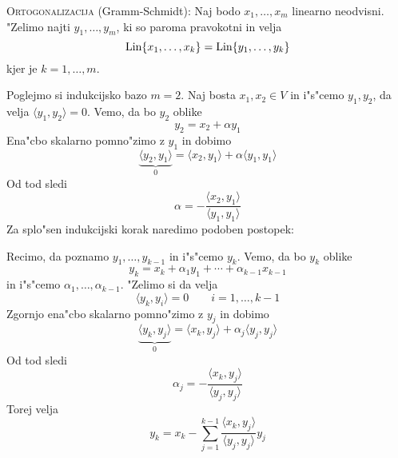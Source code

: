 \textsc{Ortogonalizacija} (Gramm-Schmidt): Naj bodo $x_1, \ldots, x_m$ linearno neodvisni. "Zelimo najti $y_1, \ldots, y_m$, ki so paroma pravokotni in velja
\begin{equation*}
\text{Lin} \{ x_1, \ldots, x_k \} = \text{Lin} \{ y_1, \ldots, y_k \}
\end{equation*}
kjer je $k = 1, \ldots, m$.

Poglejmo si indukcijsko bazo $m = 2$. Naj bosta $x_1, x_2 \in V$ in i"s"cemo $y_1, y_2$, da velja $\langle y_1, y_2 \rangle = 0$. Vemo, da bo $y_2$ oblike
\begin{equation*}
y_2 = x_2 + \alpha y_1
\end{equation*}
Ena"cbo skalarno pomno"zimo z $y_1$ in dobimo
\begin{equation*}
\underbrace{\langle y_2, y_1 \rangle}_{0} = \langle x_2, y_1 \rangle + \alpha \langle y_1, y_1 \rangle
\end{equation*}
Od tod sledi
\begin{equation*}
\alpha = - \dfrac{\langle x_2, y_1 \rangle}{\langle y_1, y_1 \rangle}
\end{equation*}
%
Za splo"sen indukcijski korak naredimo podoben postopek:

Recimo, da poznamo $y_1, \ldots, y_{k-1}$ in i"s"cemo $y_k$. Vemo, da bo $y_k$ oblike
\begin{equation*}
y_k = x_k + \alpha_1 y_1 + \cdots + \alpha_{k-1} x_{k-1}
\end{equation*}
in i"s"cemo $\alpha_1, \ldots, \alpha_{k-1}$. "Zelimo si da velja
\begin{equation*}
\langle y_k, y_i \rangle = 0 \qquad i = 1, \ldots, k-1
\end{equation*}
Zgornjo ena"cbo skalarno pomno"zimo z $y_j$ in dobimo
\begin{equation*}
\underbrace{\langle y_k, y_j \rangle}_{0} = \langle x_k, y_j \rangle + \alpha_j \langle y_j, y_j \rangle
\end{equation*}
Od tod sledi
\begin{equation*}
\alpha_j = - \dfrac{\langle x_k, y_j \rangle}{\langle y_j, y_j \rangle}
\end{equation*}
Torej velja
\begin{equation}
\label{eq:gm-ortogonalizacija}
y_k = x_k - \sum_{j = 1}^{k-1} \dfrac{\langle x_k, y_j \rangle}{\langle y_j, y_j \rangle} y_j
\end{equation}

